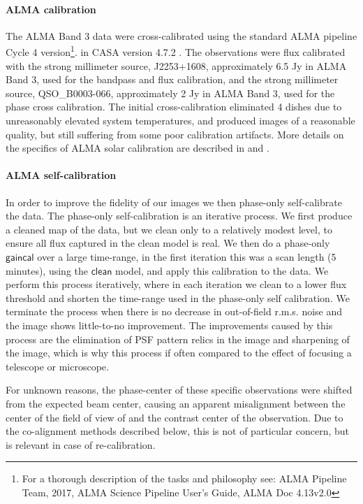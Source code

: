 \documentclass[twocolumn]{aastex62}
\newcommand{\code}[1]{\ensuremath{\textsf{#1}}}
\newcommand{\fnc}[1]{\code{#1}}
\begin{document}
\paragraph{ALMA calibration} The ALMA Band 3 data were cross-calibrated using the standard ALMA pipeline Cycle 4 version\footnote{For a thorough description of the tasks and philosophy see: ALMA Pipeline Team, 2017, ALMA Science Pipeline User’s Guide, ALMA Doc 4.13v2.0}. in CASA version 4.7.2 \citep{casa}. 
The observations were flux calibrated with the strong millimeter source, J2253+1608, approximately 6.5 Jy in ALMA Band 3, used for the bandpass and flux calibration, and the strong millimeter source, QSO\_B0003-066, approximately 2 Jy in ALMA Band 3, used for the phase cross calibration. 
The initial cross-calibration eliminated 4 dishes due to unreasonably elevated system temperatures, and produced images of a reasonable quality, but still suffering from some poor calibration artifacts.
More details on the specifics of ALMA solar calibration are described in \citet{2017ShimojoEA_ALMASolarInt} and \citet{2017WhiteEA_ALMASD}.
\paragraph{ALMA self-calibration} In order to improve the fidelity of our images we then phase-only self-calibrate the data. 
The phase-only self-calibration is an iterative process. 
We first produce a cleaned map of the data, but we clean only to a relatively modest level, to ensure all flux captured in the clean model is real. 
We then do a phase-only \fnc{gaincal} over a large time-range, in the first iteration this was a scan length (5 minutes), using the \fnc{clean} model, and apply this calibration to the data. 
We perform this process iteratively, where in each iteration we clean to a lower flux threshold and shorten the time-range used in the phase-only self calibration. 
We terminate the process when there is no decrease in out-of-field r.m.s. noise and the image shows little-to-no improvement. 
The improvements caused by this process are the elimination of PSF pattern relics in the image and sharpening of the image, which is why this process if often compared to the effect of focusing a telescope or microscope.\par

For unknown reasons, the phase-center of these specific observations were shifted from the expected beam center, causing an apparent misalignment between the center of the field of view of and the contrast center of the observation.
Due to the co-alignment methods described below, this is not of particular concern, but is relevant in case of re-calibration.\par
\end{document}
